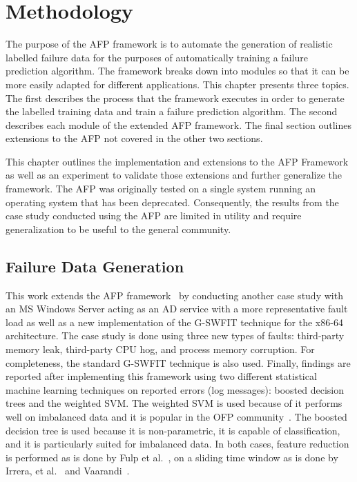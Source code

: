 \chapter{Methodology} \label{chapter3}
The purpose of the \ac{AFP} framework is to automate the generation of
realistic labelled failure data for the purposes of automatically training a
failure prediction algorithm.  The framework breaks down into modules so that
it can be more easily adapted for different applications.  This chapter
presents three topics.  The first describes the process that the framework
executes in order to generate the labelled training data and train a failure
prediction algorithm.  The second describes each module of the extended
\ac{AFP} framework.  The final section outlines extensions to the \ac{AFP} not
covered in the other two sections.

This chapter outlines the implementation and extensions to the \ac{AFP}
Framework~\cite{irrera2015} as well as an experiment to validate those
extensions and further generalize the framework.  The \ac{AFP} was originally
tested on a single system running an operating system that has been deprecated.
Consequently, the results from the case study conducted using the \ac{AFP} are
limited in utility and require generalization to be useful to the general
community.

\section{Failure Data Generation} \label{sec:generation}
This work extends the \ac{AFP} framework~\cite{irrera2015} by conducting
another case study with an \ac{MS} Windows Server acting as an \ac{AD} service
with a more representative fault load as well as a new implementation of the
\ac{G-SWFIT} technique for the x86-64 architecture.  The case study is done
using three new types of faults: third-party memory leak, third-party \ac{CPU}
hog, and process memory corruption.  For completeness, the standard
\ac{G-SWFIT} technique is also used.  Finally, findings are reported after
implementing this framework using two different statistical machine learning
techniques on reported errors (log messages): boosted decision trees and the
weighted \ac{SVM}.  The weighted \ac{SVM} is used because of it performs well
on imbalanced data and it is popular in the \ac{OFP}
community~\cite{salfnerSurvey}.  The boosted decision tree is used because it
is non-parametric, it is capable of classification, and it is particularly
suited for imbalanced data.  In both cases, feature reduction is performed as
is done by Fulp et al.~\cite{fulp2008}, on a sliding time window as is done by
Irrera, et al.~\cite{irrera2013a} and Vaarandi~\cite{vaarandi2002}.

